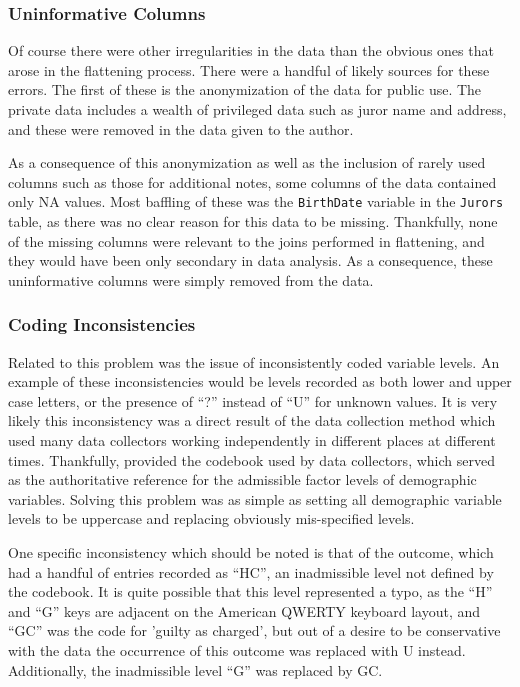 \subsubsection{Uninformative Columns}

Of course there were other irregularities in the data than the obvious ones that arose in the flattening process. There were a
handful of likely sources for these errors. The first of these is the anonymization of the data for public use. The private data
includes a wealth of privileged data such as juror name and address, and these were removed in the data given to the
author.

As a consequence of this anonymization as well as the inclusion of rarely used columns such as those for additional notes, some
columns of the data contained only NA values. Most baffling of these was the \texttt{BirthDate} variable in the \texttt{Jurors}
table, as there was no clear reason for this data to be missing. Thankfully, none of the missing columns were relevant to the
joins performed in flattening, and they would have been only secondary in data analysis. As a consequence, these uninformative
columns were simply removed from the data.

\subsubsection{Coding Inconsistencies}

Related to this problem was the issue of inconsistently coded variable levels. An example of these inconsistencies would be levels
recorded as both lower and upper case letters, or the presence of ``?'' instead of ``U'' for unknown values. It is very likely
this inconsistency was a direct result of the data collection method which used many data collectors working independently in
different places at different times. Thankfully, \citeauthor{JurySunshineProj} provided the codebook used by data collectors,
which served as the authoritative reference for the admissible factor levels of demographic variables. Solving this problem was as
simple as setting all demographic variable levels to be uppercase and replacing obviously mis-specified levels.

One specific inconsistency which should be noted is that of the outcome, which had a handful of entries recorded as ``HC'', an
inadmissible level not defined by the codebook. It is quite possible that this level represented a typo, as the ``H'' and ``G''
keys are adjacent on the American QWERTY keyboard layout, and ``GC'' was the code for 'guilty as charged', but out of a desire to
be conservative with the data the occurrence of this outcome was replaced with U instead. Additionally, the inadmissible level
``G'' was replaced by GC.

